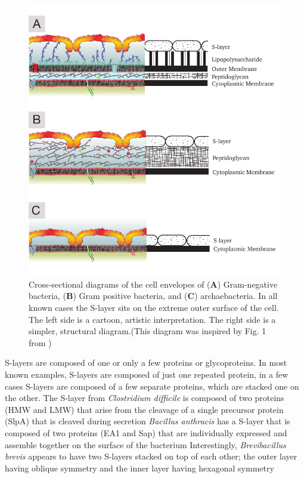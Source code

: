 \begin{figure}[htb] %
  \begin{center}
    \includegraphics{intro/img/celwalls.pdf}
  \end{center}
  \caption[Cross-sectional diagrams of \ac{S-layer} containing cell envelopes]{Cross-sectional
    diagrams of the cell envelopes of (\textbf{A}) Gram-negative bacteria, (\textbf{B}) Gram
    positive bacteria, and (\textbf{C}) archaebacteria. In all known cases the \ac{S-layer} sits on
    the extreme outer surface of the cell. The left side is a cartoon, artistic interpretation. The right side is a simpler, structural diagram.(This diagram was inspired by Fig. 1 from
    )}
  \label{fig:cellwalls}
\end{figure}

\Acp{S-layer} are composed of one or only a few proteins or glycoproteins. In most known examples,
\acp{S-layer} are composed of just one repeated protein, in a few cases \acp{S-layer} are composed
of a few separate proteins, which are stacked one on the other. The \ac{S-layer} from \textit{Clostridium difficile} is composed of two
proteins (HMW and LMW) that arise from the cleavage of a single precursor protein (SlpA) that is
cleaved during secretion \textit{Bacillus
  anthracis} has a \ac{S-layer} that is composed of two proteins (EA1 and Sap) that are individually
expressed and assemble together on the surface of the bacterium
Interestingly, \textit{Brevibacillus brevis} appears to have two \acp{S-layer} stacked on top of each
other; the outer layer having oblique symmetry and the inner layer having hexagonal
symmetry
    
